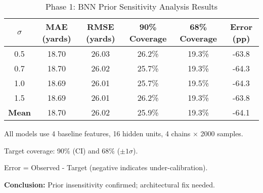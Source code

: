 \begin{table}[htbp]
\centering
\caption{Phase 1: BNN Prior Sensitivity Analysis Results}
\label{tab:phase1_prior_sensitivity}
\begin{tabular}{cccccc}
\toprule
$\sigma$ & MAE (yards) & RMSE (yards) & 90\% Coverage & 68\% Coverage & Error (pp) \\
\midrule
0.5 & 18.70 & 26.03 & 26.2\% & 19.3\% & -63.8 \\
0.7 & 18.70 & 26.02 & 25.7\% & 19.3\% & -64.3 \\
1.0 & 18.69 & 26.01 & 25.7\% & 19.5\% & -64.3 \\
1.5 & 18.69 & 26.01 & 26.2\% & 19.3\% & -63.8 \\
\midrule
\textbf{Mean} & 18.70 & 26.02 & 25.9\% & 19.3\% & -64.1 \\
\bottomrule
\end{tabular}
\begin{tablenotes}
\small
\item All models use 4 baseline features, 16 hidden units, 4 chains $\times$ 2000 samples.
\item Target coverage: 90\% (CI) and 68\% ($\pm 1\sigma$).
\item Error = Observed - Target (negative indicates under-calibration).
\item \textbf{Conclusion:} Prior insensitivity confirmed; architectural fix needed.
\end{tablenotes}
\end{table}
